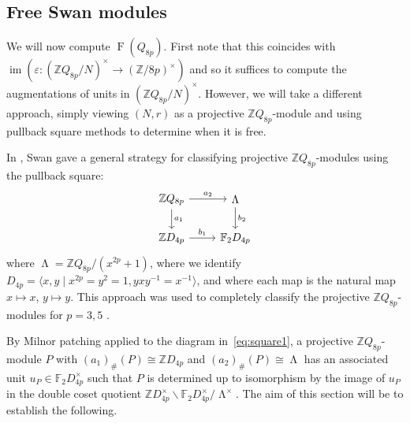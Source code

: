 \documentclass[11pt,leqno,a4paper]{amsart}
\newcommand{\Z}{\mathbb{Z}}
\newcommand{\F}{\mathbb{F}}
\DeclareMathOperator{\IM}{im}
\DeclareMathOperator{\FF}{F}
\DeclareMathOperator{\LL}{\Lambda}
\theoremstyle{definition}
\theoremstyle{remark}
\theoremstyle{custom}
\begin{document}
\subsection{Free Swan modules}
\label{ss:swan-free}

We will now compute $\FF(Q_{8p})$.
First note that this coincides with $\IM(\varepsilon : (\Z Q_{8p}/N)^\times \to (\Z/8p)^\times)$ and so it suffices to compute the augmentations of units in $(\Z Q_{8p}/N)^\times$. However, we will take a different approach, simply viewing $(N,r)$ as a projective $\Z Q_{8p}$-module and using pullback square methods to determine when it is free.

In \cite[Section 11]{Sw83}, Swan gave a general strategy for classifying projective $\Z Q_{8p}$-modules using the pullback square: 
\begin{equation}
\begin{tikzcd}
	\Z Q_{8p} \ar[r,"a_2"] \ar[d,"a_1"] & \LL \ar[d,"b_2"] \\
	\Z D_{4p} \ar[r,"b_1"] & \F_2 D_{4p} 
\end{tikzcd}
\label{eq:square1}
\end{equation}
where $\LL = \Z Q_{8p}/(x^{2p}+1)$, where we identify $D_{4p} = \langle x,y \mid x^{2p}=y^2=1,yxy^{-1}=x^{-1}\rangle$, and where each map is the natural map $x \mapsto x$, $y \mapsto y$.
This approach was used to completely classify the projective $\Z Q_{8p}$-modules for $p = 3, 5$ \cite[Theorem 11.14]{Sw83}.

By Milnor patching \cite{Mi71} applied to the diagram in~\cref{eq:square1}, a projective $\Z Q_{8p}$-module $P$ with $(a_1)_\#(P) \cong \Z D_{4p}$ and $(a_2)_\#(P) \cong \LL$ has an associated unit $u_P \in \F_2 D_{4p}^\times$ such that $P$ is determined up to isomorphism by the image of $u_P$ in the double coset quotient $\Z D_{4p}^\times \backslash \F_2 D_{4p}^\times /{\LL^\times}$.
The aim of this section will be to establish the following.
\end{document}
